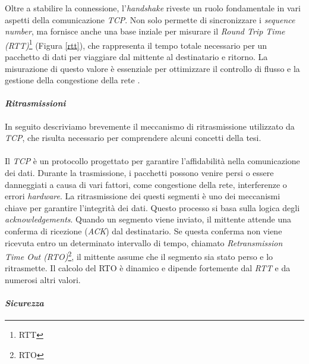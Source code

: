 \noindent Oltre a stabilire la connessione, l'\emph{handshake} riveste un ruolo fondamentale in vari aspetti della comunicazione \emph{TCP}.
Non solo permette di sincronizzare i \emph{sequence number}, ma fornisce anche una base inziale per misurare il \emph{Round Trip Time (RTT)}\footnote{\gls{RTT}} (Figura \ref{rtt}), che rappresenta il tempo totale necessario per un pacchetto di dati per viaggiare dal mittente al destinatario e ritorno. La misurazione di questo valore è essenziale per ottimizzare il controllo di flusso e la gestione della congestione della rete \cite{site:tcp}.

\paragraph{\textit{Ritrasmissioni}}

\noindent In seguito descriviamo brevemente il meccanismo di ritrasmissione utilizzato da \emph{TCP}, che risulta necessario per comprendere alcuni concetti della tesi.
\\\\
\noindent Il \emph{TCP} è un protocollo progettato per garantire l'affidabilità nella comunicazione dei dati. Durante la trasmissione, i pacchetti possono venire persi o essere danneggiati a causa di vari fattori, come congestione della rete, interferenze o errori \emph{hardware}.
La ritrasmissione dei questi segmenti è uno dei meccanismi chiave per garantire l'integrità dei dati. Questo processo si basa sulla logica degli \emph{acknowledgements}. Quando un segmento viene inviato, il mittente attende una conferma di ricezione (\emph{ACK}) dal destinatario. Se questa conferma non viene ricevuta entro un determinato intervallo di tempo, chiamato \emph{Retransmission Time Out (RTO)}\footnote{\gls{RTO}}, il mittente assume che il segmento sia stato perso e lo ritrasmette.
Il calcolo del RTO è dinamico e dipende fortemente dal \emph{RTT} e da numerosi altri valori. 
\paragraph{\textit{Sicurezza}}

